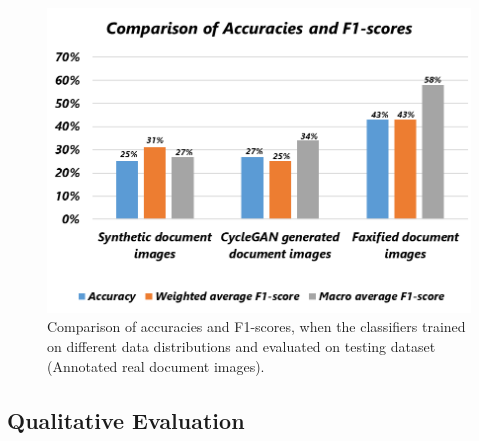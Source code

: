 \begin{figure}[H]
        \begin{center}
	    \includegraphics[scale=0.60]{images/Evaluation/ComparisonOfAccuracyAndF1Score.png}
	    \caption[Comparison of accuracies and F1-scores, when the classifiers trained on different data distributions and evaluated on testing dataset (Annotated real document images).]{Comparison of accuracies and F1-scores, when the classifiers trained on different data distributions and evaluated on testing dataset (Annotated real document images).}
	    \label{fig:ComparisonOfAccuracyAndF1Score}
	    \end{center}
\end{figure}




\subsection{Qualitative Evaluation}\label{QualitativeResults}




